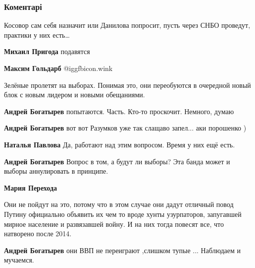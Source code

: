  
 
 
 
 
\subsubsection{Коментарі}

\begin{itemize} %
Косовор сам себя назначит или Данилова попросит, пусть через СНБО проведут, практики у них есть…

\begin{itemize} %
\textbf{Михаил Пригода} подавятся

\textbf{Максим Гольдарб}  @igg{fbicon.wink} 
\end{itemize} %


Зелёные пролетят на выборах. Понимая это, они переобуются в очередной новый
блок с новым лидером и новыми обещаниями.

\begin{itemize} %
\textbf{Андрей Богатырев} попытаются. Часть. Кто-то проскочит. Немного, думаю

\textbf{Андрей Богатырев} вот вот Разумков уже так слащаво запел... аки порошенко )

\textbf{Наталья Павлова} Да, работают над этим вопросом. Время у них ещё есть.

\textbf{Андрей Богатырев} Вопрос в том, а будут ли выборы? Эта банда может и выборы аннулировать в принципе.

\textbf{Мария Перехода} 

Они не пойдут на это, потому что в этом случае они дадут отличный повод Путину
официально объявить их чем то вроде хунты узурпаторов, запугавшей мирное
население и развязавшей войну. И на них тогда повесят все, что натворено после
2014.

\textbf{Андрей Богатырев} они ВВП не переиграют ,слишком тупые ... Наблюдаем и мучаемся.


\end{itemize}
\end{itemize}

